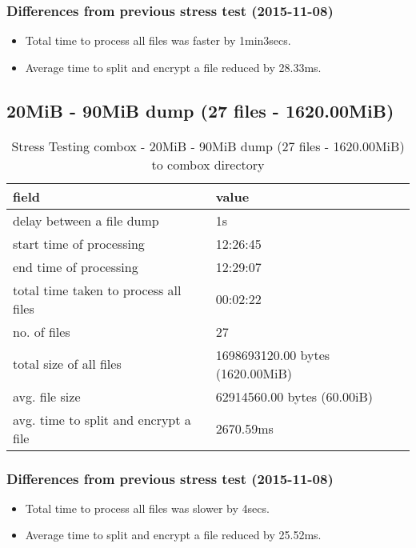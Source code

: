 \subsubsection{Differences from previous stress test (2015-11-08)}

\begin{itemize}
\item Total time to process all files was faster by 1min3secs.
\item Average time to split and encrypt a file reduced by 28.33ms.
\end{itemize}

\subsection{20MiB - 90MiB dump (27 files -
  1620.00MiB)}\label{4-st-1620}

\begin{center}
  \begin{table}[h]
    \begin{tabular}{ll}
      field & value\\
      \hline
      delay between a file dump & 1s\\
      start time of processing & 12:26:45\\
      end time of processing & 12:29:07\\
      total time taken to process all files & 00:02:22\\
      no. of files & 27\\
      total size of all files & 1698693120.00 bytes (1620.00MiB)\\
      avg. file size & 62914560.00 bytes (60.00iB)\\
      avg. time to split and encrypt a file & 2670.59ms\\
    \end{tabular}
    \caption{Stress Testing combox - 20MiB - 90MiB dump (27 files - 1620.00MiB) to combox directory}
  \end{table}
\end{center}

\subsubsection{Differences from previous stress test (2015-11-08)}

\begin{itemize}
\item Total time to process all files was slower by 4secs.
\item Average time to split and encrypt a file reduced by 25.52ms.
\end{itemize}

